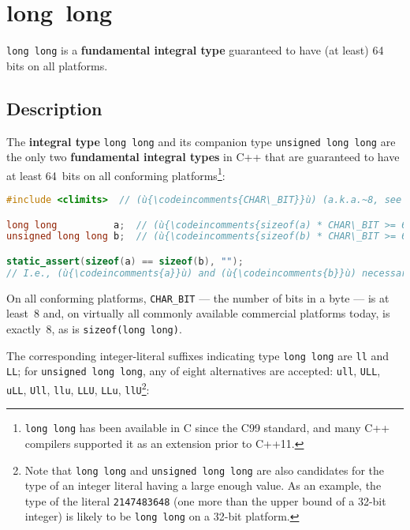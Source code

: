 \newpage
\section[{\tt long}~{\tt long}]{{\SecCode long}~{\SecCode long}}\label{long-long}


\texttt{long long} is a \textbf{fundamental integral type} guaranteed to have (at least) 64 bits on all
platforms.

\subsection[Description]{Description}\label{description}

The \textbf{integral type} \texttt{long}~\texttt{long} and its companion
type \texttt{unsigned}~\texttt{long}~\texttt{long} are the only two
\textbf{fundamental integral types} in C++ that are guaranteed to have
at least 64~bits on all conforming platforms{\cprotect\footnote{\texttt{long}~\texttt{long}
has been available in C since the C99 standard, and many C++ compilers
supported it as an extension prior to C++11.}}:

\begin{lstlisting}[language=C++]
#include <climits>  // (ù{\codeincomments{CHAR\_BIT}}ù) (a.k.a.~8, see below)

long long          a;  // (ù{\codeincomments{sizeof(a) * CHAR\_BIT >= 64}}ù)
unsigned long long b;  // (ù{\codeincomments{sizeof(b) * CHAR\_BIT >= 64}}ù)

static_assert(sizeof(a) == sizeof(b), "");
// I.e., (ù{\codeincomments{a}}ù) and (ù{\codeincomments{b}}ù) necessarily have the same size in every program.
\end{lstlisting}

\noindent On all conforming platforms, \texttt{CHAR\_BIT} --- the number of bits
in a byte --- is at least~8 and, on virtually all commonly available
commercial platforms today, is exactly~8, as is
\texttt{sizeof(long}~\texttt{long)}.

The corresponding integer-literal suffixes indicating type
\texttt{long}~\texttt{long} are \texttt{ll} and \texttt{LL}; for
\texttt{unsigned}~\texttt{long}~\texttt{long}, any of eight alternatives
are accepted: \texttt{ull}, \texttt{ULL}, \texttt{uLL}, \texttt{Ull},
\texttt{llu}, \texttt{LLU}, \texttt{LLu},
\texttt{llU}{\cprotect\footnote{Note that \texttt{long}~\texttt{long}
and \texttt{unsigned}~\texttt{long}~\texttt{long} are also candidates
for the type of an integer literal having a large enough value. As an
example, the type of the literal \texttt{2147483648} (one more than
the upper bound of a 32-bit integer) is likely to be
\texttt{long}~\texttt{long} on a 32-bit platform.}}:

